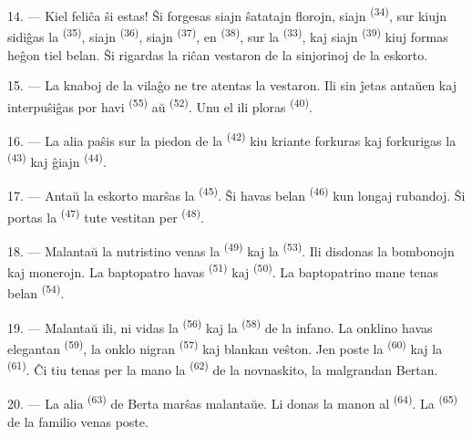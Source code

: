 14. --- Kiel feliĉa ŝi estas! Ŝi forgesas siajn ŝatatajn florojn, siajn
 \textsuperscript{(34)}, sur kiujn sidiĝas la
 \textsuperscript{(35)}, siajn 
\textsuperscript{(36)}, siajn  \textsuperscript{(37)}, en
 \textsuperscript{(38)}, sur la 
\textsuperscript{(33)}, kaj siajn  \textsuperscript{(39)} kiuj
formas heĝon tiel belan. Ŝi rigardas la riĉan vestaron de la sinjorinoj de la
eskorto.

15. --- La knaboj de la vilaĝo ne tre atentas la vestaron. Ili sin ĵetas
antaŭen kaj interpuŝiĝas por havi  \textsuperscript{(55)} aŭ
 \textsuperscript{(52)}. Unu el ili ploras
\textsuperscript{(40)}.

16. --- La alia paŝis sur la piedon de la 
\textsuperscript{(42)} kiu kriante forkuras kaj forkurigas la
 \textsuperscript{(43)} kaj ĝiajn 
\textsuperscript{(44)}.

\VUsaut{5.0mm}
\VUsaut{4.0mm}

17. --- Antaŭ la eskorto marŝas la  \textsuperscript{(45)}.
Ŝi havas belan  \textsuperscript{(46)} kun longaj rubandoj. Ŝi
portas la  \textsuperscript{(47)} tute vestitan per
 \textsuperscript{(48)}.

18. --- Malantaŭ la nutristino venas la 
\textsuperscript{(49)} kaj la  \textsuperscript{(53)}. Ili
disdonas la bombonojn kaj monerojn. La baptopatro havas 
\textsuperscript{(51)} kaj  \textsuperscript{(50)}.
La baptopatrino mane tenas belan  \textsuperscript{(54)}.

19. --- Malantaŭ ili, ni vidas la  \textsuperscript{(56)} kaj la
 \textsuperscript{(58)} de la infano. La onklino havas
elegantan  \textsuperscript{(59)}, la onklo nigran
 \textsuperscript{(57)} kaj blankan veŝton. Jen poste la
 \textsuperscript{(60)} kaj la 
\textsuperscript{(61)}. Ĉi tiu tenas per la mano la 
\textsuperscript{(62)} de la novnaskito, la malgrandan Bertan.

20. --- La alia  \textsuperscript{(63)} de Berta marŝas
malantaŭe. Li donas la manon al  \textsuperscript{(64)}. La
 \textsuperscript{(65)} de la familio venas poste.

